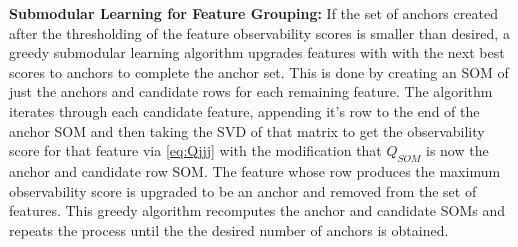 \documentclass[10pt,twocolumn,letterpaper]{article}
\begin{document}
\textbf{Submodular Learning for Feature Grouping:} If the set of anchors created after the thresholding of the feature observability scores is smaller than desired, a greedy submodular learning algorithm upgrades features with with the next best scores to anchors to complete the anchor set. This is done by creating an SOM of just the anchors and candidate rows for each remaining feature. The algorithm iterates through each candidate feature, appending it's row to the end of the anchor SOM and then taking the SVD of that matrix to get the observability score for that feature via \eqref{eq:Qjjj} with the modification that $Q_{SOM}$ is now the anchor and candidate row SOM. The feature whose row produces the maximum observability score is upgraded to be an anchor and removed from the set of features. This greedy algorithm recomputes the anchor and candidate SOMs and repeats the process until the the desired number of anchors is obtained.
\end{document}
